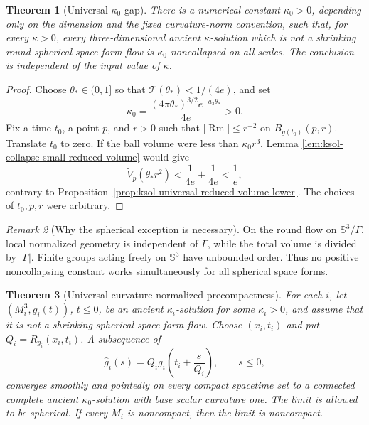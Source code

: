 \documentclass[10pt]{coll-l}
\newcommand{\Sph}{\mathbb{S}}
\newtheorem{theorem}{Theorem}[chapter]
\theoremstyle{definition}
\theoremstyle{remark}
\newtheorem{remark}[theorem]{Remark}
\numberwithin{section}{chapter}
\numberwithin{equation}{chapter}
\newcommand{\Rm}{\operatorname{Rm}}
\begin{document}
\begin{theorem}[Universal $\kappa_0$-gap]
\label{thm:ksol-universal-kappa-gap}
There is a numerical constant $\kappa_0>0$, depending only on the dimension
and the fixed curvature-norm convention, such that, for every $\kappa>0$,
every three-dimensional ancient $\kappa$-solution which is not a shrinking
round spherical-space-form flow is $\kappa_0$-noncollapsed on all scales.
The conclusion is independent of the input value of $\kappa$.
\end{theorem}

\begin{proof}
Choose $\theta_*\in(0,1]$ so that
$\mathcal T(\theta_*)<1/(4e)$, and set
\begin{equation}
 \kappa_0=
 \frac{(4\pi\theta_*)^{3/2}e^{-a_3\theta_*}}{4e}>0.    \label{eq:ksol-universal-kappa0}
\end{equation}
Fix a time $t_0$, a point $p$, and $r>0$ such that
$|\Rm|\leq r^{-2}$ on $B_{g(t_0)}(p,r)$.  Translate $t_0$ to zero.  If the
ball volume were less than $\kappa_0r^3$, Lemma
\ref{lem:ksol-collapse-small-reduced-volume} would give
\[
 \widetilde V_p(\theta_*r^2)
 <\frac1{4e}+\frac1{4e}<\frac1e,
\]
contrary to Proposition~\ref{prop:ksol-universal-reduced-volume-lower}.
The choices of $t_0,p,r$ were arbitrary.
\end{proof}

\begin{remark}[Why the spherical exception is necessary]
\label{rem:ksol-spherical-gap-exception}
On the round flow on $\Sph^3/\Gamma$, local normalized geometry is
independent of $\Gamma$, while the total volume is divided by $|\Gamma|$.
Finite groups acting freely on $\Sph^3$ have unbounded order.  Thus no
positive noncollapsing constant works simultaneously for all spherical
space forms.
\end{remark}

\begin{theorem}[Universal curvature-normalized precompactness]
\label{thm:ksol-universal-precompactness}
For each $i$, let $(M_i^3,g_i(t))$, $t\leq0$, be an ancient
$\kappa_i$-solution for some $\kappa_i>0$, and assume that it is not a
shrinking spherical-space-form flow.  Choose $(x_i,t_i)$ and put
$Q_i=R_{g_i}(x_i,t_i)$.  A subsequence of
\begin{equation}
 \widehat g_i(s)=Q_i g_i\!\left(t_i+\frac{s}{Q_i}\right),
 \qquad s\leq0,                                        \label{eq:ksol-universal-normalized-sequence}
\end{equation}
converges smoothly and pointedly on every compact spacetime set to a
connected complete ancient $\kappa_0$-solution with base scalar curvature
one.  The limit is allowed to be spherical.  If every $M_i$ is noncompact,
then the limit is noncompact.
\end{theorem}
\end{document}
